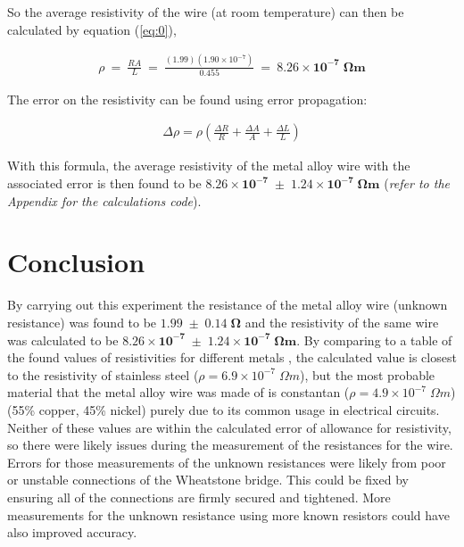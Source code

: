 \documentclass[12pt]{article}
\begin{document}
So the average resistivity of the wire (at room temperature) can then be calculated by equation (\ref{eq:0}),

\vspace{-2ex}
\begin{gather*}
    \rho \: = \: \frac{RA}{L} \: = \: \frac{(1.99)(1.90 \times 10^{-7})}{0.455} \: = \: \mathbf{8.26 \times 10 ^{-7} \; \Omega m}
\end{gather*}

The error on the resistivity can be found using error propagation:

\vspace{-2ex}
\begin{gather*}
    \Delta \rho = \rho\left( \frac{\Delta R}{R} + \frac{\Delta A}{A} + \frac{\Delta L}{L} \right)
\end{gather*}

With this formula, the average resistivity of the metal alloy wire with the associated error is then found to be $\mathbf{8.26 \times 10^{-7} \; \pm \; 1.24 \times 10^{-7} \; \Omega m}$ (\textit{refer to the Appendix for the calculations code}).

\vspace{3.5cm}

\section{Conclusion} \label{sec:4}

By carrying out this experiment the resistance of the metal alloy wire (unknown resistance) was found to be $\mathbf{1.99 \; \pm \; 0.14 \; \Omega}$ and the resistivity of the same
wire was calculated to be $\mathbf{8.26 \times 10^{-7} \; \pm \; 1.24 \times 10^{-7} \; \Omega m}$. By comparing to a table of the found values of resistivities for different metals \cite{resistvity},
the calculated value is closest to the resistivity of stainless steel ($\rho = 6.9 \times 10^{-7} \; \Omega m$), but the most probable material that the metal alloy wire was made of is constantan ($\rho = 4.9 \times 10 ^{-7} \; \Omega m$) (55\% copper, 45\% nickel)
purely due to its common usage in electrical circuits. Neither of these values are within the calculated error of allowance for resistivity, so there were likely issues during the measurement of the resistances for the wire. Errors for those measurements of the
unknown resistances were likely from poor or unstable connections of the Wheatstone bridge. This could be fixed by ensuring all of the connections are firmly secured and tightened.
More measurements for the unknown resistance using more known resistors could have also improved accuracy. 
\end{document}

